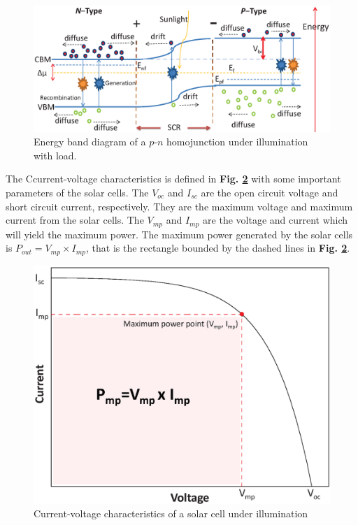 \documentclass[a4paper, 12pt, titlepage,oneside,drop]{kthesis}
\begin{document}
\begin{figure}[H]
\centering
\includegraphics[scale=0.5]{illumination1.eps}
\caption{Energy band diagram of a $p$-$n$ homojunction under illumination with load.}
\label{illu1}
\end{figure}


The Ccurrent-voltage characteristics is defined in \textbf{Fig. \ref{ivcharac}} with some important parameters of the solar cells. The $V_{oc}$ and $I_{sc}$ are the open circuit voltage and short circuit current, respectively. 
They are the maximum voltage and maximum current from the solar cells. The $V_{mp}$ and $I_{mp}$ are the voltage and current which will yield the maximum power. The maximum power generated by the solar cells
is $P_{out}=V_{mp} \times I_{mp}$, that is the rectangle bounded by the dashed lines in \textbf{Fig. \ref{ivcharac}}. 

\begin{figure}[H]
\centering
\includegraphics[scale=0.5]{IV.eps}
\caption{Current-voltage characteristics of a solar cell under illumination}
\label{ivcharac}
\end{figure}
\end{document}
